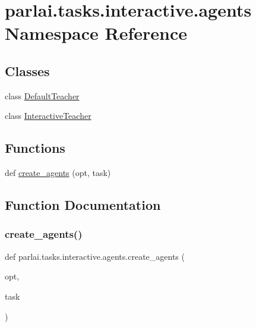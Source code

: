 \hypertarget{namespaceparlai_1_1tasks_1_1interactive_1_1agents}{}\section{parlai.\+tasks.\+interactive.\+agents Namespace Reference}
\label{namespaceparlai_1_1tasks_1_1interactive_1_1agents}
\subsection*{Classes}
\begin{DoxyCompactItemize}
\item 
class \hyperlink{classparlai_1_1tasks_1_1interactive_1_1agents_1_1DefaultTeacher}{Default\+Teacher}
\item 
class \hyperlink{classparlai_1_1tasks_1_1interactive_1_1agents_1_1InteractiveTeacher}{Interactive\+Teacher}
\end{DoxyCompactItemize}
\subsection*{Functions}
\begin{DoxyCompactItemize}
\item 
def \hyperlink{namespaceparlai_1_1tasks_1_1interactive_1_1agents_af1eee4433fa720c868ac8cea506bfc89}{create\+\_\+agents} (opt, task)
\end{DoxyCompactItemize}


\subsection{Function Documentation}
\mbox{\label{namespaceparlai_1_1tasks_1_1interactive_1_1agents_af1eee4433fa720c868ac8cea506bfc89}} 
\subsubsection{\texorpdfstring{create\+\_\+agents()}{create\_agents()}}
{\footnotesize\ttfamily def parlai.\+tasks.\+interactive.\+agents.\+create\+\_\+agents (\begin{DoxyParamCaption}\item[{}]{opt,  }\item[{}]{task }\end{DoxyParamCaption})}

